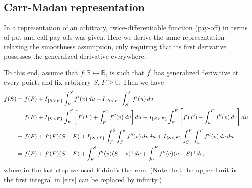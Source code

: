 \documentclass[pdftex,11pt,a4paper] {article}
\begin{document}
\subsection{Carr-Madan representation}

\label{sec:carrmadan} In \cite{Carr2001} a representation of an arbitrary,
twice-differentiable function (pay-off) in terms of put and call pay-offs was
given. Here we derive the same representation relaxing the smoothness
assumption, only requiring that its first derivative possesses the
generalized derivative everywhere.

To this end, assume that $f:\mathbb{R}\mapsto \mathbb{R}$, is such that $%
f^{\prime }$ has generalized derivative at every point, and fix arbitrary $%
S,\,F\geq0$. Then we have
\begin{align}
f(S)&=f(F)+I_{\{S>F\}}\int_F^Sf^{\prime
}(u)\,du-I_{\{S<F\}}\int_S^Ff^{\prime }(u)\,du  \notag \\
&=f(F)+I_{\{S>F\}}\int_F^S\left[f^{\prime }(F)+\int_F^uf^{\prime \prime
}(v)\,dv\right]du- I_{\{S<F\}}\int_S^F\left[f^{\prime }(F)-\int_u^Ff^{\prime
\prime }(v)\,dv\right]du  \notag \\
&=f(F)+f^{\prime }(F)(S-F)+I_{\{S>F\}}\int_F^S\int_F^uf^{\prime \prime
}(v)\,dv\,du +I_{\{S<F\}}\int_S^F\int_u^F f^{\prime \prime }(v)\,dv\,du
\notag \\
&=f(F)+f^{\prime }(F)(S-F)+\int_F^S f^{\prime \prime }(v)(S-v)^{+}dv+\int_0^F f^{\prime
\prime }(v)(v-S)^{+}dv,  \label{e:rs}
\end{align}
where in the last step we used Fubini's theorem. (Note that the upper limit
in the first integral in \eqref{e:rs} can be replaced by infinity.)
\end{document}
